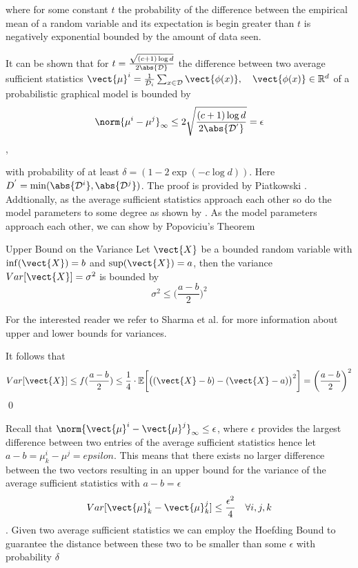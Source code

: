 where for some constant $t$ the probability of the difference between the empirical mean of a random variable and its expectation is begin greater than $t$ is negatively exponential bounded by the amount of data seen.

It can be shown that for $t = \frac{\sqrt{(c+1) \log d}}{2\abs{\mathcal{D}}}$ the difference between two average sufficient statistics $\vect{\mu}^i = \frac{1}{\mathcal{D}_i} \sum_{x \in \mathcal{D}} \vect{\phi(x)}, \quad \vect{\phi(x)} \in \mathbb{R}^d$ of a probabilistic graphical model is bounded by
\begin{equation}
    \norm{\mu^{i} -  \mu^{j}}_\infty \leq 2 \sqrt{
        \frac{(c+1) \log d}
        {2\abs{\mathcal{D^{'}}}}
        } = \epsilon
\end{equation},

with probability of at least $\delta= (1- 2 \exp(-c \log d))$. Here $D^{'} = \min(\abs{\mathcal{D}^i}, \abs{\mathcal{D}^j})$.
The proof is provided by Piatkowski \cite{piatkowski2019distributed}. 
Addtionally, as the average sufficient statistics approach each other so do the model parameters to some degree as shown by .
As the model parameters approach each other, we can show by Popoviciu's Theorem \cite{popoviciu1935equations} 
\begin{threm}{Upper Bound on the Variance}
    Let $\vect{X}$ be a bounded random variable with $\inf(\vect{X}) = b$ and $\sup(\vect{X}) = a$, 
    then the variance $Var[\vect{X}] = \sigma^2$ is bounded by 
    \begin{equation}
        \sigma^2 \leq \bigg(\frac{a-b}{2}\bigg)^{2}
    \end{equation}
\end{threm}
For the interested reader we refer to Sharma et al. \cite{sharma2010betterbounds} for more information about upper and lower bounds for variances.



It follows that
\begin{equation*}
    Var[\vect{X}] \leq f(\frac{a-b}{2}) \leq  \frac{1}{4} \cdot \mathbb{E}\bigg[\big((\vect{X} - b) - (\vect{X} - a)\big)^2\bigg]  =  \bigg(\frac{a-b}{2}\bigg)^2 
\end{equation*}\qed

Recall that $\norm{\vect{\mu}^{i} -  \vect{\mu}^{j}}_\infty \leq  \epsilon$, where $\epsilon$ provides the largest difference between two entries of the average sufficient statistics hence let $a - b = \mu^{i}_k - \mu^{j} = epsilon$.
This means that there exists no larger difference between the two vectors resulting in an upper bound for the variance of the average sufficient statistics with $a - b = \epsilon$ 
\begin{equation*}
    Var[\vect{\mu}^{i}_k -  \vect{\mu}^{j}_k] \leq \frac{\epsilon^2}{4} \quad \forall i,j,k
\end{equation*}.
Given two average sufficient statistics we can employ the Hoefding Bound to guarantee the distance between these two to be smaller than some $\epsilon$ with probability $\delta$

